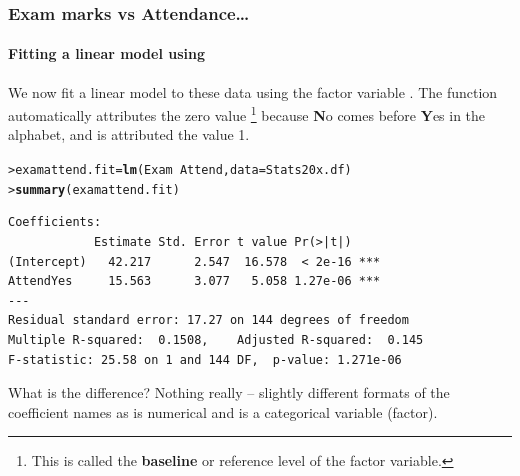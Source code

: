 \documentclass{beamer}\usepackage[]{graphicx}\usepackage[]{xcolor}
\makeatletter
\newcommand{\hlopt}[1]{\textcolor[rgb]{0,0,0}{#1}}%
\newcommand{\hlstd}[1]{\textcolor[rgb]{0.345,0.345,0.345}{#1}}%
\newcommand{\hlkwb}[1]{\textcolor[rgb]{0.69,0.353,0.396}{#1}}%
\newcommand{\hlkwc}[1]{\textcolor[rgb]{0.333,0.667,0.333}{#1}}%
\newcommand{\hlkwd}[1]{\textcolor[rgb]{0.737,0.353,0.396}{\textbf{#1}}}%
\newenvironment{kframe}{%
 \def\at@end@of@kframe{}%
 \ifinner\ifhmode%
  \def\at@end@of@kframe{\end{minipage}}%
  \begin{minipage}{\columnwidth}%
 \fi\fi%
 \def\FrameCommand##1{\hskip\@totalleftmargin \hskip-\fboxsep
 \colorbox{shadecolor}{##1}\hskip-\fboxsep
     \hskip-\linewidth \hskip-\@totalleftmargin \hskip\columnwidth}%
 \MakeFramed {\advance\hsize-\width
   \@totalleftmargin\z@ \linewidth\hsize
   \@setminipage}}%
 {\par\unskip\endMakeFramed%
 \at@end@of@kframe}
\newenvironment{knitrout}{}{} %
\makeatother
\begin{document}
\begin{frame}[fragile]
\frametitle{Exam marks vs Attendance\ldots}
\framesubtitle{Fitting a linear model using } 

We now fit a linear model to these data using the factor variable .
The  function automatically attributes  the zero value \footnote {This is called the \textbf{baseline} or reference level of the factor variable.} because \textbf{N}o comes before \textbf{Y}es in the alphabet, and  is attributed the value 1.

\begin{small}
\begin{knitrout}\scriptsize
{}\color{fgcolor}\begin{kframe}
\begin{alltt}
\hlstd{> }\hlstd{examattend.fit} \hlkwb{=} \hlkwd{lm}\hlstd{(Exam}\hlopt{~} \hlstd{Attend,} \hlkwc{data} \hlstd{= Stats20x.df)}
\hlstd{> }\hlkwd{summary}\hlstd{(examattend.fit)}
\end{alltt}
\end{kframe}
\end{knitrout}

\begin{knitrout}\scriptsize
{}\color{fgcolor}\begin{kframe}
\begin{verbatim}
Coefficients:
            Estimate Std. Error t value Pr(>|t|)    
(Intercept)   42.217      2.547  16.578  < 2e-16 ***
AttendYes     15.563      3.077   5.058 1.27e-06 ***
---
Residual standard error: 17.27 on 144 degrees of freedom
Multiple R-squared:  0.1508,	Adjusted R-squared:  0.145 
F-statistic: 25.58 on 1 and 144 DF,  p-value: 1.271e-06
\end{verbatim}
\end{kframe}
\end{knitrout}
\end{small}

What is the difference? Nothing really -- slightly different formats of the coefficient
names as  is numerical and  is a categorical variable (factor).
\end{frame}


\end{document}
